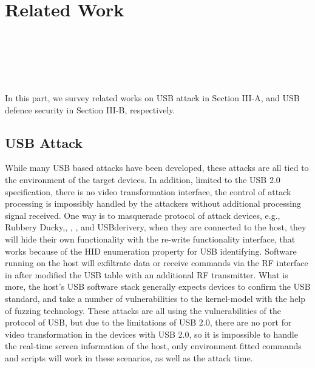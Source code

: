\section{Related Work}
\label{sec:related_work}
\\
\\
\\
\\
\\

In this part, we survey related works on USB attack in Section III-A, and USB defence security in Section III-B, respectively.

\subsection{USB Attack}
While many USB based attacks have been developed, these attacks are all tied to the environment of the target devices. In addition, limited to the USB 2.0\cite{usb20} specification, there is no video transformation interface, the control of attack processing is impossibly handled by the attackers without additional processing signal received. One way is to masquerade protocol of attack devices, e.g., Rubbery Ducky\cite{rubber},\cite{badusb}, \cite{rubberducky2020}, \cite{usbbypassing}, \cite{iseeyou}and USBderivery\cite{usbdriver}, when they are connected to the host, they will hide their own functionality with the re-write functionality interface, that works because of the HID enumeration property for USB identifying. Software running on the host will exfiltrate data or receive commands via the RF interface in \cite{turnip} after modified the USB table with an additional RF transmitter. What is more, the host's USB software stack generally expects devices to confirm the USB standard, \cite{facedancer} and \cite{syzkaller} take a number of vulnerabilities to the kernel-model with the help of fuzzing technology. These attacks are all using the vulnerabilities of the protocol of USB, but due to the limitations of USB 2.0, there are no port for video transformation in the devices with USB 2.0, so it is impossible to handle the real-time screen information of the host, only environment fitted commands and scripts will work in these scenarios, as well as the attack time.

